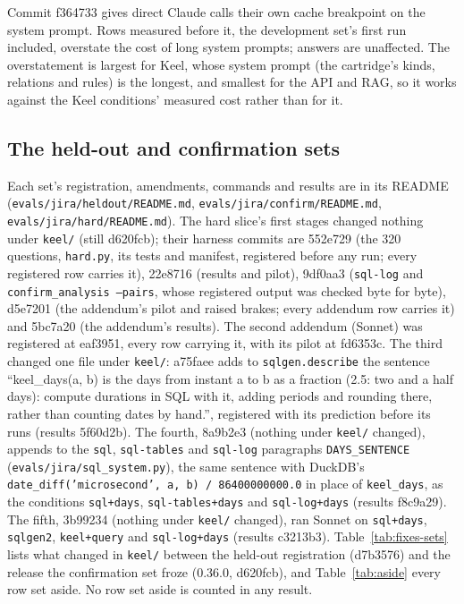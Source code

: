 \documentclass[sigconf, nonacm]{acmart}
\newcommand{\code}[1]{\texttt{#1}}
\begin{document}
Commit f364733 gives direct Claude calls their own cache breakpoint on the system prompt. Rows measured before it, the development set's first run included, overstate the cost of long system prompts; answers are unaffected. The overstatement is largest for Keel, whose system prompt (the cartridge's kinds, relations and rules) is the longest, and smallest for the API and RAG, so it works against the Keel conditions' measured cost rather than for it.

\subsection{The held-out and confirmation sets}
\label{app:prov-sets}

Each set's registration, amendments, commands and results are in its README (\code{evals/jira/heldout/README.md}, \code{evals/jira/confirm/README.md}, \code{evals/jira/hard/README.md}). The hard slice's first stages changed nothing under \code{keel/} (still d620fcb); their harness commits are 552e729 (the 320 questions, \code{hard.py}, its tests and manifest, registered before any run; every registered row carries it), 22e8716 (results and pilot), 9df0aa3 (\code{sql-log} and \code{confirm\_analysis --pairs}, whose registered output was checked byte for byte), d5e7201 (the addendum's pilot and raised brakes; every addendum row carries it) and 5bc7a20 (the addendum's results). The second addendum (Sonnet) was registered at eaf3951, every row carrying it, with its pilot at fd6353c. The third changed one file under \code{keel/}: a75faee adds to \code{sqlgen.describe} the sentence ``keel\_days(a, b) is the days from instant a to b as a fraction (2.5: two and a half days): compute durations in SQL with it, adding periods and rounding there, rather than counting dates by hand.'', registered with its prediction before its runs (results 5f60d2b). The fourth, 8a9b2e3 (nothing under \code{keel/} changed), appends to the \code{sql}, \code{sql-tables} and \code{sql-log} paragraphs \code{DAYS\_SENTENCE} (\code{evals/jira/sql\_system.py}), the same sentence with DuckDB's \code{date\_diff('microsecond', a, b) / 86400000000.0} in place of \code{keel\_days}, as the conditions \code{sql+days}, \code{sql-tables+days} and \code{sql-log+days} (results f8c9a29). The fifth, 3b99234 (nothing under \code{keel/} changed), ran Sonnet on \code{sql+days}, \code{sqlgen2}, \code{keel+query} and \code{sql-log+days} (results c3213b3). Table~\ref{tab:fixes-sets} lists what changed in \code{keel/} between the held-out registration (d7b3576) and the release the confirmation set froze (0.36.0, d620fcb), and Table~\ref{tab:aside} every row set aside. No row set aside is counted in any result.
\end{document}
